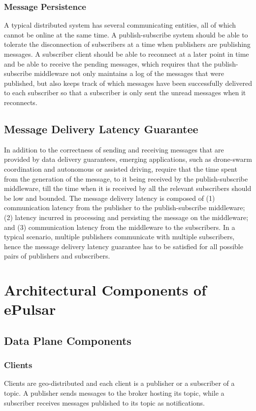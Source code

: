 \subsubsection{Message Persistence}
A typical distributed system has several communicating entities, all of which cannot be online at the same time. A publish-subscribe system should be able to tolerate the disconnection of subscribers at a time when publishers are publishing messages. A subscriber client should be able to reconnect at a later point in time and be able to receive the pending messages, which requires that the publish-subscribe middleware not only maintains a log of the messages that were published, but also keeps track of which messages have been successfully delivered to each subscriber so that a subscriber is only sent the unread messages when it reconnects.
\subsection{Message Delivery Latency Guarantee}
In addition to the correctness of sending and receiving messages that are provided by data delivery guarantees, emerging applications, such as drone-swarm coordination and autonomous or assisted driving, require that the time spent from the generation of the message, to it being received by the publish-subscribe middleware, till the time when it is received by all the relevant subscribers should be low and bounded. The message delivery latency is composed of (1) communication latency from the publisher to the publish-subscribe middleware; (2) latency incurred in processing and persisting the message on the middleware; and (3) communication latency from the middleware to the subscribers. In a typical scenario, multiple publishers communicate with multiple subscribers, hence the message delivery latency guarantee has to be satisfied for all possible pairs of publishers and subscribers.

\section{Architectural Components of ePulsar}
\label{sec:epulsar_arch}
\subsection{Data Plane Components}
\subsubsection{Clients}
Clients are geo-distributed and each client is a publisher or a subscriber of a topic. A publisher sends messages to the broker hosting its topic, while a subscriber receives messages published to its topic as notifications.
